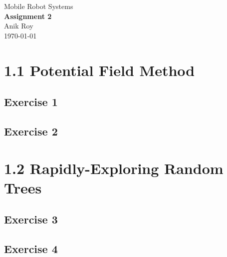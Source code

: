 \documentclass[12pt,a4paper]{article}
\begin{document}
\vfil

\begin{center}
	{\Large Mobile Robot Systems} \\
	\vspace{0.4in}
	{\huge \bf Assignment 2} \\
	\vspace{0.4in}
	{\large Anik Roy} \\
	\vspace{0.1in}
	{\large \today} \\
\end{center}
\vspace{0.4in}


\section*{1.1 Potential Field Method}
\subsection*{Exercise 1}
\begin{enumerate}[label=(\alph*)]

\end{enumerate}
\subsection*{Exercise 2}
\begin{enumerate}[label=(\alph*)]

\end{enumerate}
\section*{1.2 Rapidly-Exploring Random Trees}
\subsection*{Exercise 3}
\begin{enumerate}[label=(\alph*)]

\end{enumerate}
\subsection*{Exercise 4}
\begin{enumerate}[label=(\alph*)]

\end{enumerate}
\end{document}
